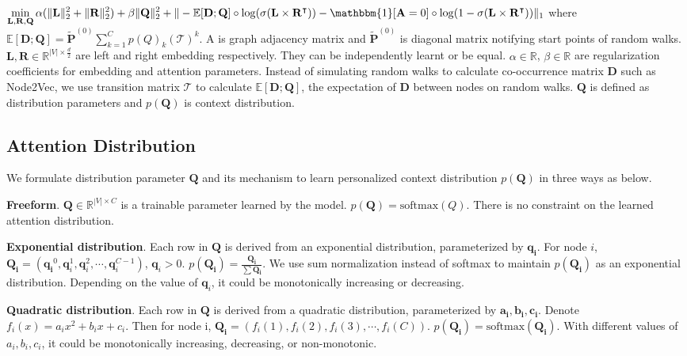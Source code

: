 \documentclass{article}
\begin{document}
$\displaystyle\min_{\mathbf{L},\mathbf{R},\mathbf{Q}}\alpha(\|\mathbf{L}\|_2^2 + \|\mathbf{R}\|_2^2 ) + \beta\|\mathbf{Q}\|_2^2 +\|-\mathbb{E}[\mathbf{D};\mathbf{Q}]\circ\log(\sigma(\mathbf{L}\times\mathbf{R}^\intercal)) -\mathbbm{1}[\mathbf{A}=0]\circ\log(1-\sigma(\mathbf{L}\times\mathbf{R}^\intercal)) \|_1$
where $\mathbb{E}[\mathbf{D};\mathbf{Q}] = \tilde{\mathbf{P}}^{(0)}\displaystyle\sum_{k=1}^{C}p(Q)_k(\mathcal{T})^k$. A is graph adjacency matrix and $\tilde{\mathbf{P}}^{(0)}$ is diagonal matrix notifying start points of random walks. $\mathbf{L}, \mathbf{R} \in \mathbb{R}^{|V|\times \frac{d}{2}}$ are left and right embedding respectively. They can be independently learnt or be equal. $\alpha \in \mathbb{R}$, $\beta \in \mathbb{R}$ are regularization coefficients for embedding and attention parameters. Instead of simulating random walks to calculate co-occurrence matrix $\mathbf{D}$ such as Node2Vec, we use transition matrix $\mathcal{T}$ to calculate $\mathbb{E}[\mathbf{D};\mathbf{Q}]$, the expectation of $\mathbf{D}$ between nodes on random walks. $\mathbf{Q}$ is defined as distribution parameters and $p(\mathbf{Q})$ is context distribution. 

\subsection{Attention Distribution}
We formulate distribution parameter $\mathbf{Q}$ and its mechanism to learn personalized context distribution $p(\mathbf{Q})$ in three ways as below.

\textbf{Freeform}.
$\mathbf{Q} \in \mathbb{R}^{|V|\times{C}}$ is a trainable parameter learned by the model. $p(\mathbf{Q}) = \text{softmax}(Q)$. There is no constraint on the learned attention distribution.

\textbf{Exponential distribution}.
Each row in $\mathbf{Q}$ is derived from an exponential distribution, parameterized by $\mathbf{q_i}$. For node $i$, $\mathbf{Q_i} = (\mathbf{q_i}^0, \mathbf{q}_i^1, \mathbf{q}_i^2, \cdots, \mathbf{q}_i^{C-1})$, $\mathbf{q}_i>0$. $p(\mathbf{Q_i}) = \frac{\mathbf{Q_i}}{\sum \mathbf{Q_i}}$. We use sum normalization instead of softmax to maintain $p(\mathbf{Q_i})$ as an exponential distribution. Depending on the value of $\mathbf{q}_i$, it could be monotonically increasing or decreasing.

\textbf{Quadratic distribution}.
Each row in $\mathbf{Q}$ is derived from a quadratic distribution, parameterized by $\mathbf{a_i, b_i, c_i}$. Denote $f_i(x) = a_ix^2+b_ix+c_i$. Then for node i, $\mathbf{Q_i} = (f_i(1), f_i(2), f_i(3), \cdots, f_i(C))$. $p(\mathbf{Q_i}) = \text{softmax}(\mathbf{Q_i})$. With different values of $a_i, b_i, c_i$, it could be monotonically increasing, decreasing, or non-monotonic.
\end{document}
